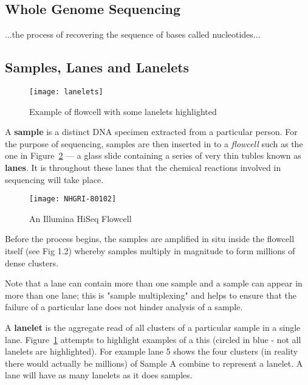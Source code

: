 \subsection{Whole Genome Sequencing}
...the process of recovering the sequence of bases called nucleotides...

\subsection{Samples, Lanes and Lanelets}

\begin{figure}[htbp!]
    \centering
    \texttt{[image: lanelets]}
    \caption[lanelets]{Example of flowcell with some lanelets highlighted}
    \label{fig:lanelets}
\end{figure}

A \textbf{sample} is a distinct DNA specimen extracted from a particular person.
For the purpose of sequencing, samples are then inserted in to a
\textit{flowcell} such as the one in Figure~\ref{fig:flowcell} ---
a glass slide containing a series of very thin tubles known as \textbf{lanes}.
It is throughout these lanes that the chemical reactions involved in sequencing
will take place.

\begin{figure}[htbp!]
    \centering
    \texttt{[image: NHGRI-80102]}
    \caption[flowcell]{An Illumina HiSeq Flowcell\citep{img:flowcell}}
    \label{fig:flowcell}
\end{figure}

Before the process begins, the samples are amplified in situ
inside the flowcell itself (see Fig 1.2) whereby samples multiply in magnitude
to form millions of dense clusters.

Note that a lane can contain more than one sample and a sample can appear in
more than one lane; this is "sample multiplexing" and helps to ensure that the
failure of a particular lane does not hinder analysis of a sample.

A \textbf{lanelet} is the aggregate read of all clusters of a particular sample
in a single lane. Figure~\ref{fig:lanelets} attempts to highlight examples of a
this (circled in blue - not all lanelets are highlighted). For example lane 5
shows the four clusters (in reality there would actually be millions) of Sample
A combine to represent a lanelet. A lane will have as many lanelets as it does
samples.


